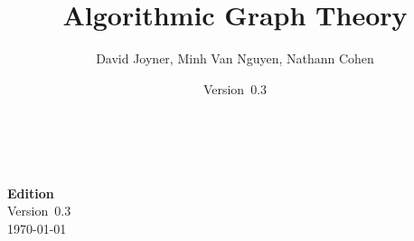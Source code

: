 \documentclass[a4paper,twoside,12pt]{book}
\newcommand{\documentEdition}{0.3}
\begin{document}
\title{\Huge{\bf{Algorithmic Graph Theory}}}
\author{\Large{David Joyner, Minh Van Nguyen, Nathann Cohen}}
\date{Version~\documentEdition}
\maketitle

{\thispagestyle{empty}
   \\\\
  \textbf{Edition} \\
  Version~\documentEdition \\
  \today
}

\frontmatter
\setcounter{tocdepth}{1}
\tableofcontents

\listofalgorithms
{}
\listoffigures
{}
\listoftables
{}

\mainmatter












\appendix


\backmatter


\printindex
\end{document}
